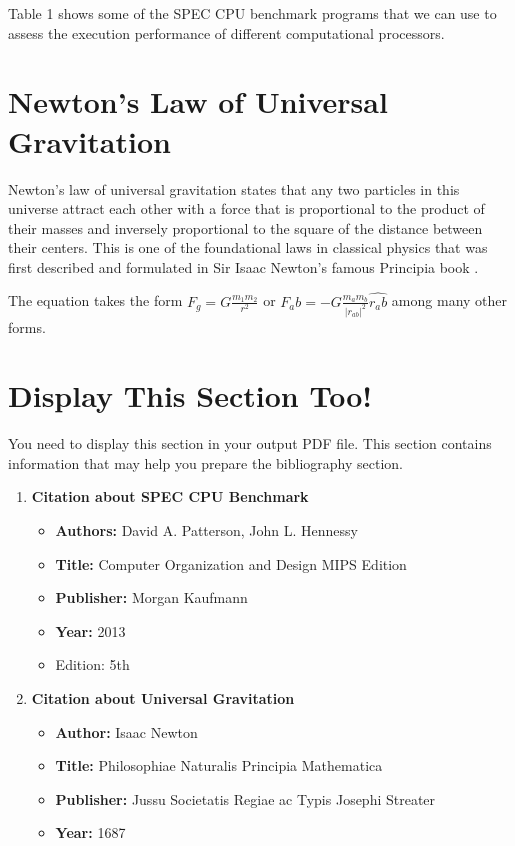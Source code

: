 \documentclass[11pt]{article}
\begin{document}
	
	
	Table 1 shows some of the SPEC CPU benchmark programs that we can use to assess
	the execution performance of different computational processors.
	
	
	\newpage
	
	\section*{Newton’s Law of Universal Gravitation}
	
	Newton’s law of universal gravitation states that any two particles in this universe attract
	each other with a force that is proportional to the product of their masses and inversely
	proportional to the square of the distance between their centers. This is one of the foundational laws in classical physics that was first described and formulated in Sir Isaac Newton’s
	famous Principia book \cite{newton}.
	
	
	The equation takes the form $F_g = G \frac{m_1 m_2}{r^2}$ or 
	$F_ab = - G \frac{m_a m_b}{|r_{ab}|^{2}} \hat{r_ab}$ among many other
	forms.
	
	\section*{Display This Section Too!}
	
	You need to display this section in your output PDF file. This section contains information
	that may help you prepare the bibliography section.
	
	\begin{enumerate}
		\item \textbf{Citation about SPEC CPU Benchmark}
		\begin{itemize}
			\item \textbf{Authors:} David A. Patterson, John L. Hennessy
			\item \textbf{Title:} Computer Organization and Design MIPS Edition
			\item \textbf{Publisher:} Morgan Kaufmann
			\item \textbf{Year:} 2013
			\item Edition: 5th
		\end{itemize}
		
		\item \textbf{Citation about Universal Gravitation}
		\begin{itemize}
			\item \textbf{Author:} Isaac Newton
			\item \textbf{Title:} Philosophiae Naturalis Principia Mathematica
			\item \textbf{Publisher:} Jussu Societatis Regiae ac Typis Josephi Streater
			\item \textbf{Year:} 1687
		\end{itemize}
		
		
	\end{enumerate}
	
	
	
	
	
\end{document}
